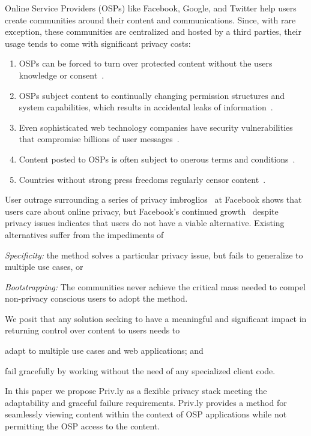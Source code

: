 \documentclass[letterpaper,twocolumn,10pt]{article}
\begin{document}
Online Service Providers (OSPs) like Facebook, Google, and Twitter help 
users create communities around their content and communications. 
Since, with rare exception, these communities are centralized and hosted by
a third parties, their usage tends to come with significant privacy costs:
\begin{enumerate}
  \setlength{\itemsep}{1pt}
  \setlength{\parskip}{0pt}
  \setlength{\parsep}{1pt}
  \item OSPs can be forced to turn over protected content without the users knowledge or consent~\cite{Greenwald2013}.
  \item OSPs subject content to continually changing permission structures and 
  system capabilities, which results in accidental leaks of information~\cite{Boyd2008}.
  \item Even sophisticated web technology companies have security vulnerabilities 
  that compromise billions of user messages~\cite{Symantec2011,Wee2011,Greenwald2013}.
  \item Content posted to OSPs is often subject to onerous terms and conditions~\cite{Gardner2011,Erwin2012,Unhosted2013}.
  \item Countries without strong press freedoms regularly censor content~\cite{MacKinnon2009,AssociatedPress2012}.
\end{enumerate}

User outrage surrounding a series of privacy imbroglios~\cite{Boyd2008} at 
Facebook shows that users care about online privacy, but Facebook's continued growth~\cite{Facebook2013} despite privacy issues 
indicates that users do not have a viable alternative. Existing alternatives 
suffer from the impediments of \begin{inparaenum}
\item \emph{Specificity:} the method solves a particular privacy issue, 
but fails to generalize to multiple use cases, or
\item \emph{Bootstrapping:} The communities never achieve the critical mass 
needed to compel non-privacy conscious users to adopt the method.
\end{inparaenum} 

We posit that any solution seeking to have a meaningful and significant impact in
 returning control over content to users needs to
\begin{inparaenum}
\item adapt to multiple use cases and web applications; and
\item fail gracefully by working without the need of any specialized client code.
\end{inparaenum} In this paper we propose Priv.ly as a flexible privacy stack
 meeting the adaptability and graceful failure requirements. Priv.ly provides a method for seamlessly viewing 
 content within the context of OSP applications while not permitting the OSP access
  to the content.
\end{document}
